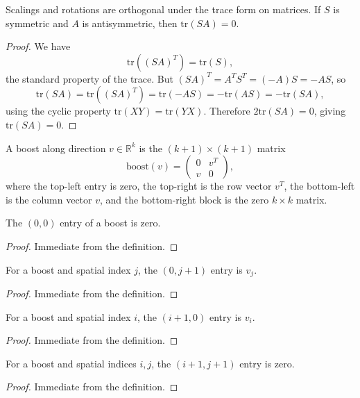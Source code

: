 \begin{theorem}
Scalings and rotations are orthogonal under the trace form on matrices. If $S$ is symmetric
and $A$ is antisymmetric, then $\text{tr}(SA) = 0$.
\end{theorem}
\begin{proof}
We have
\[\text{tr}((SA)^T) = \text{tr}(S),\]
the standard property of the trace. But $(SA)^T = A^T S^T = (-A) S = -AS$, so
\[\text{tr}(SA) = \text{tr}((SA)^T) = \text{tr}(-AS) = -\text{tr}(AS) = -\text{tr}(SA),\]
using the cyclic property $\text{tr}(XY) = \text{tr}(YX)$. Therefore $2 \text{tr}(SA) = 0$, giving $\text{tr}(SA) = 0$.
\end{proof}

\begin{definition}
A boost along direction $v \in \mathbb{R}^k$ is the $(k+1) \times (k+1)$ matrix
\[\text{boost}(v) = \begin{pmatrix} 0 & v^T \\ v & 0 \end{pmatrix},\]
where the top-left entry is zero, the top-right is the row vector $v^T$, the bottom-left
is the column vector $v$, and the bottom-right block is the zero $k \times k$ matrix.
\end{definition}

\begin{theorem}
The $(0, 0)$ entry of a boost is zero.
\end{theorem}
\begin{proof}
Immediate from the definition.
\end{proof}

\begin{theorem}
For a boost and spatial index $j$, the $(0, j+1)$ entry is $v_j$.
\end{theorem}
\begin{proof}
Immediate from the definition.
\end{proof}

\begin{theorem}
For a boost and spatial index $i$, the $(i+1, 0)$ entry is $v_i$.
\end{theorem}
\begin{proof}
Immediate from the definition.
\end{proof}

\begin{theorem}
For a boost and spatial indices $i, j$, the $(i+1, j+1)$ entry is zero.
\end{theorem}
\begin{proof}
Immediate from the definition.
\end{proof}

